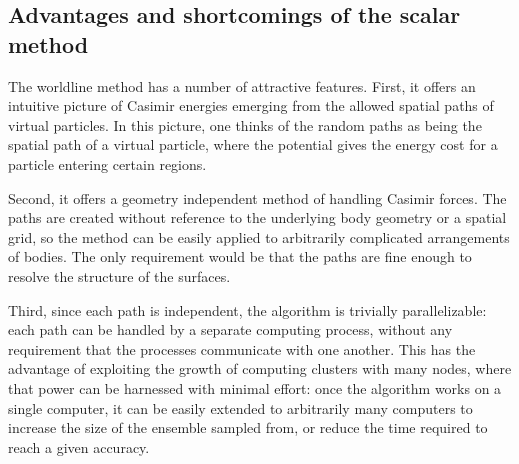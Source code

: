 
  \subsection{Advantages and shortcomings of the scalar method}

The worldline method has a number of attractive features.  
First, it offers an intuitive picture of Casimir energies emerging from the allowed spatial paths 
of virtual particles.  In this picture, one thinks of the random paths as being the spatial path
of a virtual particle, where the potential gives the energy cost for a particle entering certain regions.

Second, it offers a geometry independent method of handling Casimir forces.  The paths are 
created without reference to the underlying body geometry or a spatial grid, so the method can be easily applied to arbitrarily
complicated arrangements of bodies.  The only requirement would be that the paths are fine enough
to resolve the structure of the surfaces.  

Third, since each path is independent, the algorithm is trivially parallelizable: each path
can be handled by a separate computing process, without any requirement that the processes communicate
with one another.  This has the advantage of exploiting the growth of computing clusters with many nodes,
where that power can be harnessed with minimal effort: once the algorithm works on a single computer,
it can be easily extended to arbitrarily many computers to increase the size of the ensemble sampled
from, or reduce the time required to reach a given accuracy.  



